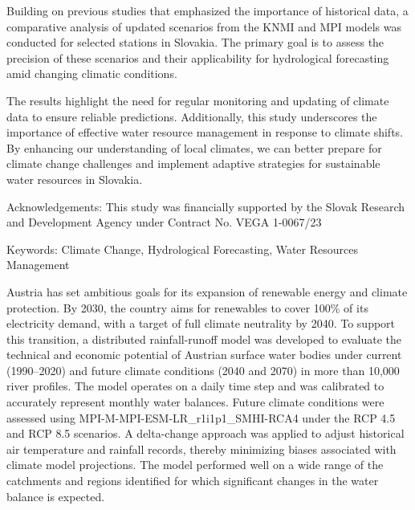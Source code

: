 Building on previous studies that emphasized the importance of historical data, a comparative analysis of updated scenarios from the KNMI and MPI models was conducted for selected stations in Slovakia. The primary goal is to assess the precision of these scenarios and their applicability for hydrological forecasting amid changing climatic conditions.

The results highlight the need for regular monitoring and updating of climate data to ensure reliable predictions. Additionally, this study underscores the importance of effective water resource management in response to climate shifts. By enhancing our understanding of local climates, we can better prepare for climate change challenges and implement adaptive strategies for sustainable water resources in Slovakia. 

Acknowledgements: This study was financially supported by the Slovak Research and Development Agency under Contract No. VEGA 1-0067/23

Keywords: Climate Change, Hydrological Forecasting, Water Resources Management
\newpage{}
{}
\begin{flushleft}





\end{flushleft}

\noindent

Austria has set ambitious goals for its expansion of renewable energy and climate protection. By 2030, the country aims for renewables to cover 100\% of its electricity demand, with a target of full climate neutrality by 2040. To support this transition, a distributed rainfall-runoff model was developed to evaluate the technical and economic potential of Austrian surface water bodies under current (1990–2020) and future climate conditions (2040 and 2070) in more than 10,000 river profiles. The model operates on a daily time step and was calibrated to accurately represent monthly water balances. Future climate conditions were assessed using MPI-M-MPI-ESM-LR\_r1i1p1\_SMHI-RCA4 under the RCP 4.5 and RCP 8.5 scenarios. A delta-change approach was applied to adjust historical air temperature and rainfall records, thereby minimizing biases associated with climate model projections. The model performed well on a wide range of the catchments and regions identified for which significant changes in the water balance is expected.

